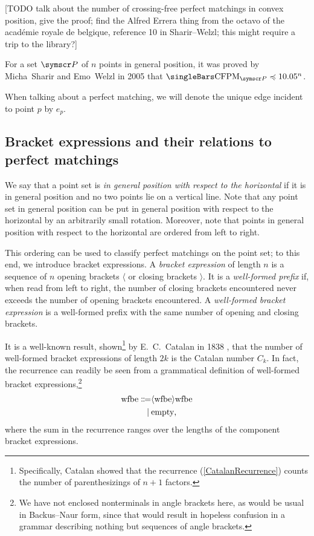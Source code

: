 \documentclass[10pt, a4paper, twoside]{basestyle}
\DeclareMathOperator{\CFPM}{CFPM}
\newcommand{\pointset}{\symscr}
\begin{document}
[TODO talk about the number of crossing-free perfect matchings in convex position, give the proof;
find the Alfred Errera thing from the octavo of the académie royale de belgique, reference 10 in
Sharir--Welzl; this might require a trip to the library?]

For a set $\pointset P$ of $n$ points in general position, it was proved by Micha~Sharir and Emo~Welzl in 2005
\cite{SharirWelzl2006} that $\Cardinality{\CFPM_{\pointset P}} \preccurlyeq 10.05^n$.

When talking about a perfect matching, we will denote the unique edge incident to point $p$ by
$e_p$.

\subsection{Bracket expressions and their relations to perfect matchings}

We say that a point set is \emph{in general position with respect to the horizontal} if it
is in general position and no two points lie on a vertical line. Note that any point set in
general position can be put in general position with respect to the horizontal by an arbitrarily
small rotation. Moreover, note that points in general position with respect to the horizontal
are ordered from left to right.

This ordering can be used to classify perfect matchings on the point set; to this end,
we introduce bracket expressions.
A \emph{bracket expression} of length $n$ is a sequence of $n$ opening brackets $\langle$ or closing
brackets $\rangle$.
It is a \emph{well-formed prefix} if, when read from left to right, the number of closing brackets
encountered never exceeds the number of opening brackets encountered.
A \emph{well-formed bracket expression} is a well-formed prefix with the same number of opening and
closing brackets.

It is a well-known result, shown\footnote{Specifically, Catalan showed that the recurrence (\ref{CatalanRecurrence})
counts the number of parenthesizings of $n+1$ factors.} by E.~C.~Catalan in 1838 \cite{Catalan1838}, that the
number of well-formed bracket expressions
of length $2k$ is the Catalan number $C_k$. In fact, the recurrence can readily be seen from
a grammatical definition of well-formed bracket expressions,\footnote{We have not enclosed nonterminals
in angle brackets here, as would be usual in Backus--Naur form, since that would result in hopeless
confusion in a grammar describing nothing but sequences of angle brackets.}\begin{align*}
\text{wfbe} \Coloneq
& \langle \text{wfbe} \rangle \text{wfbe} \\
\mid\: & \text{empty}\text,
\end{align*}
where the sum in the recurrence ranges over the lengths of the component bracket expressions.
\end{document}
